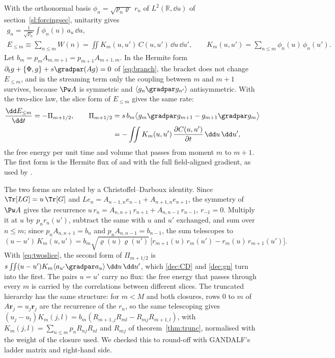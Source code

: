 With the orthonormal basis $\phi_n=\sqrt{p_n\varrho}\;r_n$ of $L^2(\mathbb R,\dd u)$ of section~\ref{sl:forcingsec}, unitarity gives
\begin{equation}\label{dec:gn}
\begin{gathered}
  g_n=\frac{1}{\sqrt{p_n}}\int\phi_n(u)\,a_u\,\dd u,\\
  E_{\le m}\equiv\sum_{n\le m}W(n)=\iint K_m(u,u')\,C(u,u')\,\dd u\,\dd u',\qquad
  K_m(u,u')=\sum_{n\le m}\phi_n(u)\,\phi_n(u') .
\end{gathered}
\end{equation}
Let $b_m=p_mA_{m,m+1}=p_{m+1}A_{m+1,m}$. In the Hermite form $\partial_tg+\{\Phi,g\}+s\gradpar(Ag)=0$ of \eqref{eq:branch}, the bracket does not change $E_{\le m}$, and in the streaming term only the coupling between $m$ and $m+1$ survives, because $\Pw A$ is symmetric and $\langle g_n\gradpar g_{n'}\rangle$ antisymmetric. With the two-slice law, the slice form of $E_{\le m}$ gives the same rate:
\begin{equation}\label{eq:fluxCD}
\begin{aligned}
  \frac{\dd E_{\le m}}{\dd t}=-\Pi_{m+1/2},\qquad
  \Pi_{m+1/2}&=s\,b_m\big\langle g_m\gradpar g_{m+1}-g_{m+1}\gradpar g_m\big\rangle\\
  &=-\iint K_m(u,u')\,\frac{\partial C(u,u')}{\partial t}\,\dd u\,\dd u' ,
\end{aligned}
\end{equation}
the free energy per unit time and volume that passes from moment $m$ to $m+1$. The first form is the Hermite flux of \citet{Schekochihin2016} and \citet{AdkinsSchekochihin2018} with the full field-aligned gradient, as used by \citet[eq.~9]{Meyrand2019}.

The two forms are related by a Christoffel--Darboux identity. Since $\Tr[LG]=u\,\Tr[G]$ and $Le_n=A_{n-1,n}e_{n-1}+A_{n+1,n}e_{n+1}$, the symmetry of $\Pw A$ gives the recurrence $u\,r_n=A_{n,n+1}\,r_{n+1}+A_{n,n-1}\,r_{n-1}$, $r_{-1}=0$. Multiply it at $u$ by $p_nr_n(u')$, subtract the same with $u$ and $u'$ exchanged, and sum over $n\le m$; since $p_nA_{n,n+1}=b_n$ and $p_nA_{n,n-1}=b_{n-1}$, the sum telescopes to
\begin{equation}\label{dec:CD}
  (u-u')\,K_m(u,u')=b_m\sqrt{\varrho(u)\varrho(u')}\,\big[r_{m+1}(u)\,r_m(u')-r_m(u)\,r_{m+1}(u')\big] .
\end{equation}
With \eqref{eq:twoslice}, the second form of $\Pi_{m+1/2}$ is $s\iint(u-u')K_m\langle a_{u'}\gradpar a_u\rangle\,\dd u\,\dd u'$, which \eqref{dec:CD} and \eqref{dec:gn} turn into the first. The pairs $u=u'$ carry no flux: the free energy that passes through every $m$ is carried by the correlations between different slices. The truncated hierarchy has the same structure: for $m<M$ and both closures, rows $0$ to $m$ of $A\boldsymbol r_j=u_j\boldsymbol r_j$ are the recurrence of the $r_n$, so the same telescoping gives $(u_j-u_l)K_m(j,l)=b_m(R_{m+1,j}R_{ml}-R_{mj}R_{m+1,l})$, with $K_m(j,l)=\sum_{n\le m}p_nR_{nj}R_{nl}$ and $R_{mj}$ of theorem~\ref{thm:trunc}, normalised with the weight of the closure used. We checked this to round-off with GANDALF's ladder matrix and right-hand side.

